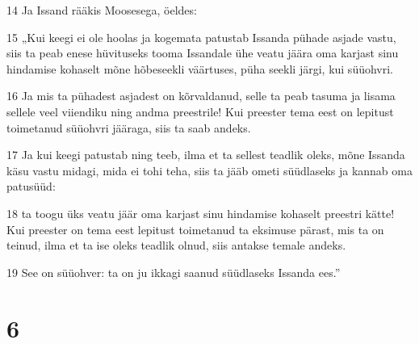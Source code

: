 \par 14 Ja Issand rääkis Moosesega, öeldes:
\par 15 „Kui keegi ei ole hoolas ja kogemata patustab Issanda pühade asjade vastu, siis ta peab enese hüvituseks tooma Issandale ühe veatu jäära oma karjast sinu hindamise kohaselt mõne hõbeseekli väärtuses, püha seekli järgi, kui süüohvri.
\par 16 Ja mis ta pühadest asjadest on kõrvaldanud, selle ta peab tasuma ja lisama sellele veel viiendiku ning andma preestrile! Kui preester tema eest on lepitust toimetanud süüohvri jääraga, siis ta saab andeks.
\par 17 Ja kui keegi patustab ning teeb, ilma et ta sellest teadlik oleks, mõne Issanda käsu vastu midagi, mida ei tohi teha, siis ta jääb ometi süüdlaseks ja kannab oma patusüüd:
\par 18 ta toogu üks veatu jäär oma karjast sinu hindamise kohaselt preestri kätte! Kui preester on tema eest lepitust toimetanud ta eksimuse pärast, mis ta on teinud, ilma et ta ise oleks teadlik olnud, siis antakse temale andeks.
\par 19 See on süüohver: ta on ju ikkagi saanud süüdlaseks Issanda ees.”

\chapter{6}

